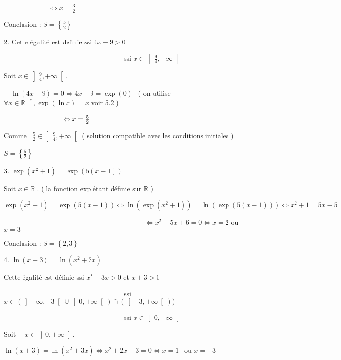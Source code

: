 \documentclass{article}
\begin{document}
\ \ \ \ \ \ \ \ \ \ \ \ \ $\Leftrightarrow x=\frac{3}{2}$

Conclusion : $S=\left\{ \frac{3}{2}\right\} $

2. Cette \'{e}galit\'{e} est d\'{e}finie ssi $4x-9>0$

\ \ \ \ \ \ \ \ \ \ \ \ \ \ \ \ \ \ \ \ \ \ \ \ \ \ \ \ \ \ \ \ \ \ \ ssi $%
x\in \left] \frac{9}{4},+\infty \right[ $

Soit $x\in \left] \frac{9}{4},+\infty \right[ .$

\ \ $\ln (4x-9)=0\Leftrightarrow 4x-9=\exp (0)$ \ ( on utilise $\forall x\in 
\mathbb{R}
^{+\ast },\exp (\ln x)=x$ voir 5.2 )

$\ \ \ \ \ \ \ \ \ \ \ \ \ \ \ \ \ \ \ \ \ \ \ \ \ \ \Leftrightarrow x=\frac{%
5}{2}$\ \ \ 

Comme \ $\frac{5}{2}\in \left] \frac{9}{4},+\infty \right[ $ ( solution
compatible avec les conditions initiales )

$S=\left\{ \frac{5}{2}\right\} $\ \ \ \ \ \ \ \ \ \ \ \ \ \ \ \ \ \ \ \ \ \
\ \ \ \ \ 

3. $\exp (x^{2}+1)=\exp (5(x-1))$

Soit $x\in 
\mathbb{R}
$ . ( la fonction exp \'{e}tant d\'{e}finie sur $%
\mathbb{R}
$ )

$\exp (x^{2}+1)=\exp (5(x-1))\Leftrightarrow \ln \left( \exp
(x^{2}+1)\right) =\ln \left( \exp (5(x-1))\right) \Leftrightarrow
x^{2}+1=5x-5$

\ \ \ \ \ \ \ \ \ \ \ \ \ \ \ \ \ \ \ \ \ \ \ \ \ \ \ \ \ \ \ \ \ \ \ \ \ \
\ \ \ $\Leftrightarrow x^{2}-5x+6=0\Leftrightarrow x=2$ ou $x=3$

Conclusion : $S=\left\{ 2,3\right\} $

4. $\ln (x+3)=\ln (x^{2}+3x)$\ \ \ 

Cette \'{e}galit\'{e} est d\'{e}finie ssi $x^{2}+3x>0$ et $x+3>0$

\ \ \ \ \ \ \ \ \ \ \ \ \ \ \ \ \ \ \ \ \ \ \ \ \ \ \ \ \ \ \ \ \ \ \ ssi $%
x\in \left( \left] -\infty ,-3\right[ \cup \left] 0,+\infty \right[ \right)
\cap \left( \left] -3,+\infty \right[ \right) )$

\ \ \ \ \ \ \ \ \ \ \ \ \ \ \ \ \ \ \ \ \ \ \ \ \ \ \ \ \ \ \ \ \ \ \ ssi $%
x\in \left] 0,+\infty \right[ $\ \ \ \ \ \ 

Soit \ \ $x\in \left] 0,+\infty \right[ .$

$\ln (x+3)=\ln (x^{2}+3x)\Leftrightarrow x^{2}+2x-3=0\Leftrightarrow x=1$ \
ou $x=-3$
\end{document}
